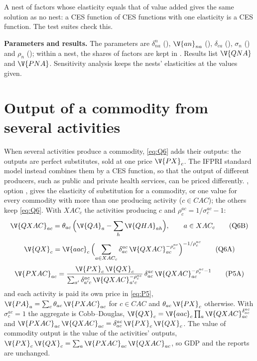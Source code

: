 A nest of factors whose elasticity equals that of value added gives the same
solution as no nest: a CES function of CES functions with one elasticity is a
CES function. The test suites check this.

\textbf{Parameters and results.} The parameters are $\delta^n_{na}$
(), $\V{an}_{na}$ (), $\delta_{ca}$ (), $\sigma_n$
() and $\rho_n$ (); within a nest, the shares of factors are
kept in . Results list $\V{QNA}$ and $\V{PNA}$. Sensitivity analysis
keeps the nests' elasticities at the values given.

\section{Output of a commodity from several activities}\label{sec:outputces}

When several activities produce a commodity, \eqref{eq:Q6} adds their
outputs: the outputs are perfect substitutes, sold at one price $\V{PX}_c$.
The IFPRI standard model \citep{lofgren2002} instead combines them by a CES
function, so that the output of different producers, such as public and
private health services, can be priced differently. ,
option , gives the elasticity of substitution for a
commodity, or one value for every commodity with more than one producing
activity ($c \in CAC$); the others keep \eqref{eq:Q6}. With $XAC_c$ the
activities producing $c$ and $\rho^{ac}_c = 1/\sigma^{ac}_c - 1$:
\begin{equation}
\V{QXAC}_{ac} = \theta_{ac}\,\Bigl(\V{QA}_a - \sum_h \V{QHA}_{ah}\Bigr), \qquad a \in XAC_c
\tag{Q6B}\label{eq:Q6B}
\end{equation}
\begin{equation}
\V{QX}_c = \V{aac}_c\,\Bigl(\sum_{a \in XAC_c} \delta^{ac}_{ac}\,\V{QXAC}_{ac}^{-\rho^{ac}_c}\Bigr)^{-1/\rho^{ac}_c}
\tag{Q6A}\label{eq:Q6A}
\end{equation}
\begin{equation}
\V{PXAC}_{ac} = \frac{\V{PX}_c\,\V{QX}_c}{\sum_{a'} \delta^{ac}_{a'c}\,\V{QXAC}_{a'c}^{-\rho^{ac}_c}}\,
  \delta^{ac}_{ac}\,\V{QXAC}_{ac}^{-\rho^{ac}_c - 1}
\tag{P5A}\label{eq:P5A}
\end{equation}
and each activity is paid its own price in \eqref{eq:P5},
$\V{PA}_a = \sum_c \theta_{ac}\,\V{PXAC}_{ac}$ for $c \in CAC$ and
$\theta_{ac}\,\V{PX}_c$ otherwise. With $\sigma^{ac}_c = 1$ the aggregate is
Cobb--Douglas, $\V{QX}_c = \V{aac}_c \prod_a \V{QXAC}_{ac}^{\delta^{ac}_{ac}}$
and $\V{PXAC}_{ac}\,\V{QXAC}_{ac} = \delta^{ac}_{ac}\,\V{PX}_c\,\V{QX}_c$. The
value of commodity output is the value of the activities' outputs,
$\V{PX}_c\,\V{QX}_c = \sum_a \V{PXAC}_{ac}\,\V{QXAC}_{ac}$, so GDP and the
reports are unchanged.

